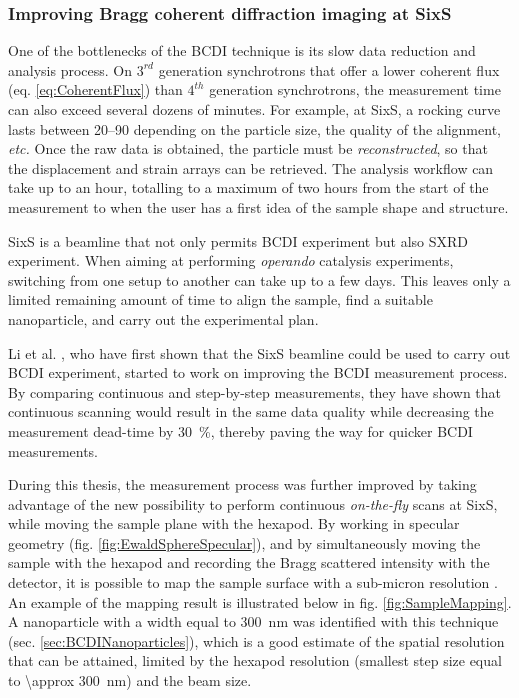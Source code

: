 \subsubsection{Improving Bragg coherent diffraction imaging at SixS}

One of the bottlenecks of the BCDI technique is its slow data reduction and analysis process.
On $3^{rd}$ generation synchrotrons that offer a lower coherent flux (eq. \ref{eq:CoherentFlux}) than $4^{th}$ generation synchrotrons, the measurement time can also exceed several dozens of minutes.
For example, at SixS, a rocking curve lasts between \qtyrange{20}{90}{\min} depending on the particle size, the quality of the alignment, \textit{etc.}
Once the raw data is obtained, the particle must be \textit{reconstructed}, so that the displacement and strain arrays can be retrieved.
The analysis workflow can take up to an hour, totalling to a maximum of two hours from the start of the measurement to when the user has a first idea of the sample shape and structure.

SixS is a beamline that not only permits BCDI experiment but also SXRD experiment.
When aiming at performing \textit{operando} catalysis experiments, switching from one setup to another can take up to a few days.
This leaves only a limited remaining amount of time to align the sample, find a suitable nanoparticle, and carry out the experimental plan.

Li et al. \parencite*{Li2020}, who have first shown that the SixS beamline could be used to carry out BCDI experiment, started to work on improving the BCDI measurement process.
By comparing continuous and step-by-step measurements, they have shown that continuous scanning would result in the same data quality while decreasing the measurement dead-time by \qty{30}{\percent}, thereby paving the way for quicker BCDI measurements.

During this thesis, the measurement process was further improved by taking advantage of the new possibility to perform continuous \textit{on-the-fly} scans at SixS, while moving the sample plane with the hexapod.
By working in specular geometry (fig. \ref{fig:EwaldSphereSpecular}), and by simultaneously moving the sample with the hexapod and recording the Bragg scattered intensity with the detector, it is possible to map the sample surface with a sub-micron resolution \parencite{Chahine2014}.
An example of the mapping result is illustrated below in fig. \ref{fig:SampleMapping}.
A nanoparticle with a width equal to \qty{300}{\nm} was identified with this technique (sec. \ref{sec:BCDINanoparticles}), which is a good estimate of the spatial resolution that can be attained, limited by the hexapod resolution (smallest step size equal to \qty{\approx 300}{\nm}) and the beam size.


